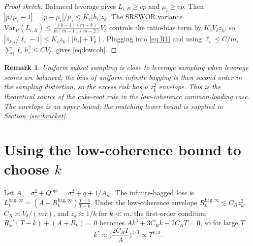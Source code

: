 \documentclass[11pt]{article}
\newcommand{\Var}{\mathrm{Var}}
\newcommand{\Rk}{R_k^{\mathrm{bag},\infty}}
\newcommand{\Qopt}{Q^{\mathrm{opt}}}
\newtheorem{remark}{Remark}
\begin{document}
\begin{proof}[Proof sketch]
Balanced leverage gives $L_{i,R}\ge cp$ and $\mu_i\ge cp$. Then
$|p/\mu_i-1|=|p-\mu_i|/\mu_i\le K_c|h_i|z_k$. The SRSWOR variance
$\Var_R(L_{i,R})\le\frac{(k-1)(m-k)}{m(m-1)(m-2)}V_\delta$ controls the ratio-bias term by
$K_cV_\delta z_k$, so $|\bar v_{k,i}/\ell_i-1|\le K_cz_k(|h_i|+V_\delta)$. Plugging into
\eqref{eq:R1} and using $\ell_i\le C/m$, $\sum_i\ell_i h_i^2\le CV_\delta$, gives
\eqref{eq:lowcoh}.
\end{proof}
\begin{remark}
Uniform subset sampling is close to leverage sampling when leverage scores are balanced; the
bias of uniform infinite bagging is then second order in the sampling distortion, so the
excess risk has a $z_k^2$ envelope. This is the theoretical source of the cube-root rule in
the low-coherence common-loading case. The envelope is an upper bound; the matching lower
bound is supplied in Section~\ref{sec:bracket}.
\end{remark}

\section{Using the low-coherence bound to choose $k$}
Let $A=\sigma_\varepsilon^2+\Qopt=\sigma_\varepsilon^2+q+1/A_m$. The infinite-bagged loss is
$L_k^{\mathrm{bag},\infty}=(A+\Rk)\frac{T-1}{T-k}$. Under the low-coherence envelope
$\Rk\lesssim C_R z_k^2$, $C_R\asymp V_\delta/(m\bar\tau)$, and $z_k\approx1/k$ for $k\ll m$,
the first-order condition $R_k'(T-k)+(A+R_k)=0$ becomes $Ak^3+3C_Rk-2C_RT=0$, so for large $T$
\begin{equation}\label{eq:k3}
  k^*\approx\Big(\frac{2C_RT}{A}\Big)^{1/3}\propto T^{1/3}.
\end{equation}

\end{document}
